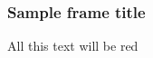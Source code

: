 \documentclass{beamer}
\begin{document}
	
	\begin{frame}
		\frametitle{Sample frame title}
		\par
		
		{\color{green} All this text will be red}
	\end{frame}
	
\end{document}
